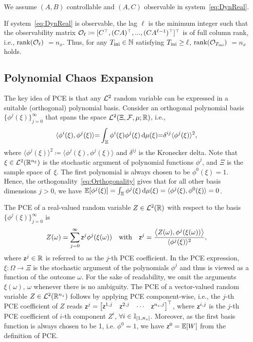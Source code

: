 \begin{assum} \label{ass:Sys}
	\quad We assume $(A,B)$ controllable and $(A,C)$ observable in system~\eqref{eq:DynReal}.
\end{assum}
If system~\eqref{eq:DynReal} is observable, the lag $\ell$ is the minimum integer such that the observability matrix $\mathcal{O}_{\ell}\coloneqq [C^\top, (CA)^\top,...,(CA^{\ell-1})^\top]^\top$ is of full column rank, i.e., $\text{rank}(\mathcal{O}_{\ell})$ $=n_x$. Thus, for any $T_\text{ini}\in\mathbb{N}$ satisfying $T_\text{ini}\geq\ell$, $\text{rank}(\mathcal{O}_{T_\text{ini}})$ $=n_x$ holds.

\subsection{Polynomial Chaos Expansion}
The key idea of PCE is that any $\mathcal{L}^2$ random variable can be expressed in a suitable (orthogonal) polynomial basis. Consider an orthogonal polynomial basis $\{\phi^j(\xi)\}_{j=0}^{\infty}$ that spans the space $\mathcal{L}^2(\Xi, \mathcal{F}, \mu; \mathbb{R})$, i.e.,
\begin{equation} \label{eq:Orthogonality}
	\langle \phi^i(\xi),\phi^j(\xi) \rangle {=} \int_{\Xi} \phi^i(\xi) \phi^j(\xi) \mathop{}\!\mathrm{d} \mu(\xi) {=} \delta^{ij}\langle\phi^j(\xi) \rangle^2,
\end{equation}
where $\langle \phi^j(\xi) \rangle^2\coloneqq \langle \phi^j(\xi),\phi^j(\xi) \rangle$ and $\delta^{ij}$ is the Kronecker delta. Note that $\xi\in \mathcal{L}^2(\mathbb{R}^{n_\xi})$ is the stochastic argument of polynomial functions $\phi^j$, and $\Xi$ is the sample space of~$\xi$. The first polynomial is always chosen to be $\phi^0(\xi) = 1$. Hence, the orthogonality~\eqref{eq:Orthogonality} gives that for all other basis dimensions $j>0$, we have $\mathbb{E}[\phi^j(\xi)]=\int_{\Xi} \phi^j(\xi) \mathop{}\!\mathrm{d} \mu(\xi) = \langle \phi^j(\xi),\phi^0(\xi)\rangle=0$.

The PCE of a real-valued random variable $Z \in  \mathcal{L}^2(\mathbb{R})$ with respect to the basis $\{\phi^j(\xi)\}_{j=0}^{\infty}$ is 
\[
Z(\omega) = \sum_{j=0}^{\infty}\mathsf{z}^j \phi^j(\xi(\omega)) \quad \text{with} \quad \mathsf{z}^j = \frac{\big\langle Z(\omega), \phi^j(\xi(\omega)) \big\rangle}{\langle\phi^j(\xi) \rangle^2},
\]
where $\mathsf{z}^j\in \mathbb{R}$ is referred to as the $j$-th PCE coefficient. In the PCE expression, $\xi:\Omega\to\Xi$ is the stochastic argument of the polynomials $\phi^j$ and thus is viewed as a function of the outcome $\omega$. For the sake of readability, we omit the arguments $\xi(\omega)$, $\omega$ whenever there is no ambiguity. The PCE of a vector-valued random variable $Z\in\mathcal{L}^2(\mathbb{R}^{n_z})$ follows by applying PCE component-wise, i.e., the $j$-th PCE coefficient of $Z$ reads
$\mathsf{z}^{j} =\begin{bmatrix} \mathsf{z}^{1,j} & \mathsf{z}^{2,j} & \cdots & \mathsf{z}^{n_z,j} \end{bmatrix}^\top$, where $\mathsf{z}^{i,j}$ is the $j$-th PCE coefficient of $i$-th component $Z^i$, $\forall i\in\mathbb{I}_{[1,n_z]}$. Moreover, as the first basis function is always chosen to be 1, i.e. $\phi^0=1$, we have $\mathsf{z}^0=\mathbb{E}[W]$ from the definition of PCE.


